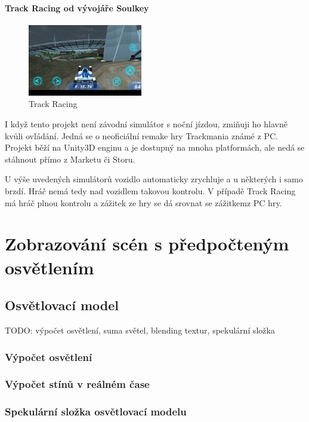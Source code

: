 \documentclass[11pt,twoside,a4paper]{book}
\begin{document}
\subsubsection{Track Racing od vývojáře Soulkey}
\begin{figure}
  \includegraphics[width=50mm]{figures/games/tm.png}
  \caption{Track Racing}
\end{figure}
I když tento projekt není závodní simulátor s noční jízdou, zmiňuji ho hlavně kvůli ovládání. Jedná se o neoficiální remake hry Trackmania známé z PC. Projekt běží na Unity3D enginu a je dostupný na mnoha platformách, ale nedá se stáhnout přímo z Marketu či Storu.

U výše uvedených simulátorů vozidlo automaticky zrychluje a u některých i samo brzdí. Hráč nemá tedy nad vozidlem takovou kontrolu. V případě Track Racing má hráč plnou kontrolu a zážitek ze hry se dá srovnat se zážitkem\linebreak z PC hry.

\chapter{Zobrazování scén s předpočteným osvětlením}

\section{Osvětlovací model}
TODO: výpočet osvětlení, suma světel, blending textur, spekulární složka

\subsection{Výpočet osvětlení}

\subsection{Výpočet stínů v reálném čase}

\subsection{Spekulární složka osvětlovací modelu}
\end{document}
